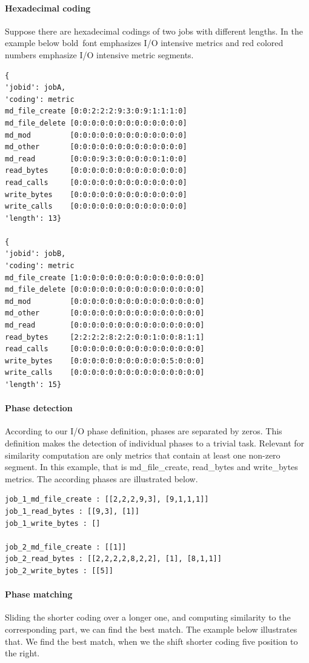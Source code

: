 \documentclass[]{llncs}
\begin{document}
\paragraph{Hexadecimal coding}
Suppose there are hexadecimal codings of two jobs with different lengths.
In the example below bold\ font emphasizes I/O intensive  metrics and red colored numbers emphasize I/O intensive metric segments.


\begin{lstlisting}
{ 
'jobid': jobA,
'coding': metric
md_file_create [0:0:2:2:2:9:3:0:9:1:1:1:0]
md_file_delete [0:0:0:0:0:0:0:0:0:0:0:0:0]
md_mod         [0:0:0:0:0:0:0:0:0:0:0:0:0]
md_other       [0:0:0:0:0:0:0:0:0:0:0:0:0]
md_read        [0:0:0:9:3:0:0:0:0:0:1:0:0]
read_bytes     [0:0:0:0:0:0:0:0:0:0:0:0:0]
read_calls     [0:0:0:0:0:0:0:0:0:0:0:0:0]
write_bytes    [0:0:0:0:0:0:0:0:0:0:0:0:0]
write_calls    [0:0:0:0:0:0:0:0:0:0:0:0:0]
'length': 13} 

{ 
'jobid': jobB,
'coding': metric
md_file_create [1:0:0:0:0:0:0:0:0:0:0:0:0:0:0]
md_file_delete [0:0:0:0:0:0:0:0:0:0:0:0:0:0:0]
md_mod         [0:0:0:0:0:0:0:0:0:0:0:0:0:0:0]
md_other       [0:0:0:0:0:0:0:0:0:0:0:0:0:0:0]
md_read        [0:0:0:0:0:0:0:0:0:0:0:0:0:0:0]
read_bytes     [2:2:2:2:8:2:2:0:0:1:0:0:8:1:1]
read_calls     [0:0:0:0:0:0:0:0:0:0:0:0:0:0:0]
write_bytes    [0:0:0:0:0:0:0:0:0:0:0:5:0:0:0]
write_calls    [0:0:0:0:0:0:0:0:0:0:0:0:0:0:0]
'length': 15} 
\end{lstlisting}

\paragraph{Phase detection}
According to our I/O phase definition, phases are separated by zeros.
This definition makes the detection of individual phases to a trivial task.
Relevant for similarity computation are only metrics that contain at least one non-zero segment.
In this example, that is md\_file\_create, read\_bytes and write\_bytes metrics.
The according phases are illustrated below.

\begin{lstlisting}
job_1_md_file_create : [[2,2,2,9,3], [9,1,1,1]]
job_1_read_bytes : [[9,3], [1]]
job_1_write_bytes : []

job_2_md_file_create : [[1]]
job_2_read_bytes : [[2,2,2,2,8,2,2], [1], [8,1,1]]
job_2_write_bytes : [[5]]
\end{lstlisting}


\paragraph{Phase matching}
Sliding the shorter coding over a longer one, and computing similarity to the corresponding part, we can find the best match.
The example below illustrates that.
We find the best match, when we the shift shorter coding five position to the right.
\end{document}
